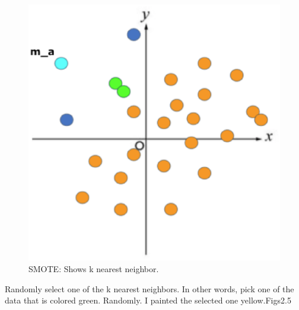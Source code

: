 \begin{center}
    \begin{figure}[ht]
        \caption{SMOTE: Shows k nearest neighbor.}
        \label{tab:team-rating-features}
        \begin{center}
            \includegraphics[scale=0.6]{image/smote3.eps}
        \end{center}
    \end{figure}
\end{center}

\clearpage

Randomly select one of the k nearest neighbors.
In other words, pick one of the data that is colored green. Randomly.
I painted the selected one yellow.Figs2.5

